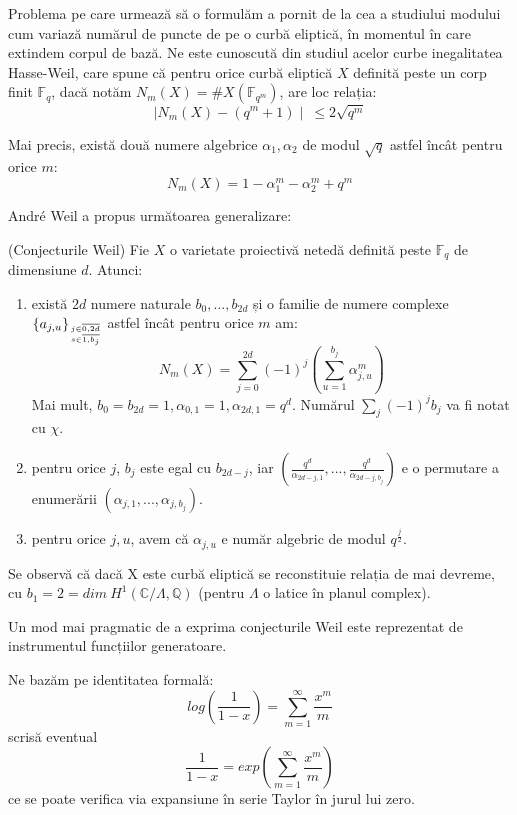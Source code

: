 \documentclass[13pt,openany]{book}
\begin{document}
Problema pe care urmează să o formulăm a pornit de la cea a studiului modului cum variază numărul de puncte de pe o curbă eliptică, în momentul în care extindem corpul de bază. Ne este cunoscută din studiul acelor curbe inegalitatea Hasse-Weil, care spune că pentru orice curbă eliptică $X$ definită peste un corp finit $\mathbb{F}_q$, dacă notăm $N_m(X)=\#X(\mathbb{F}_{q^m})$, are loc relația:
$$\mid N_m(X) - (q^m+1)\mid\  \leq 2\sqrt{q^m}$$

Mai precis, există două numere algebrice $\alpha_1,\alpha_2$ de modul $\sqrt{q}$ astfel încât pentru orice $m$:
$$N_m(X) = 1 - \alpha_1^m - \alpha_2^m + q^m$$

André Weil a propus următoarea generalizare:
\begin{teo}
(Conjecturile Weil) Fie $X$ o varietate proiectivă netedă definită peste $\mathbb{F}_q$ de dimensiune $d$. Atunci:
\begin{enumerate}
\item există $2d$ numere naturale $b_0,...,b_{2d}$ și o familie de numere complexe $\{a_{j,u}\}_{j\in\overline{0,2d}\atop s\in\overline{1,b_j}}$ astfel încât pentru orice $m$ am:
$$N_m(X)=\sum\limits_{j=0}^{2d} (-1)^j (\sum\limits_{u=1}^{b_j} \alpha_{j,u}^m)$$
Mai mult, $b_0=b_{2d}=1, \alpha_{0,1}=1, \alpha_{2d,1}=q^d$. Numărul $\sum\limits_j (-1)^j b_j$ va fi notat cu $\chi$.
\item pentru orice $j$, $b_j$ este egal cu $b_{2d-j}$, iar $(\frac{q^d}{\alpha_{2d-j,1}},...,\frac{q^d}{\alpha_{2d-j,b_j}})$ e o permutare a enumerării $(\alpha_{j,1},...,\alpha_{j,b_j})$.
\item pentru orice $j,u$, avem că $\alpha_{j,u}$ e număr algebric de modul $q^{\frac{j}{2}}$.
\end{enumerate}
\end{teo}

Se observă că dacă X este curbă eliptică se reconstituie relația de mai devreme, cu $b_1=2=dim\ H^1(\mathbb{C}/\Lambda, \mathbb{Q})$ (pentru $\Lambda$ o latice în planul complex).

Un mod mai pragmatic de a exprima conjecturile Weil este reprezentat de instrumentul funcțiilor generatoare.

Ne bazăm pe identitatea formală:
$$log(\frac{1}{1-x})=\sum\limits_{m=1}^{\infty} \frac{x^m}{m}$$
scrisă eventual
$$\frac{1}{1-x}=exp(\sum\limits_{m=1}^{\infty} \frac{x^m}{m})$$
ce se poate verifica via expansiune în serie Taylor în jurul lui zero.
\end{document}
